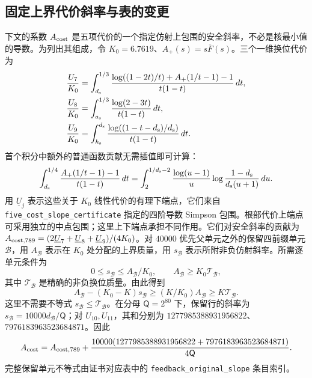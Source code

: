 \subsection{固定上界代价斜率与表的变更}
\label{num:cost-slope}
下文的系数 $A_{\rm cost}$ 是五项代价的一个指定仿射上包围的安全斜率，不必是核最小值的导数。为列出其组成，令 $K_0=6.7619$、$A_+(s)=s\overline F(s)$。三个一维换位代价为
\begin{align*}
 \frac{U_7}{K_0}&=\int_{d_{\rm s}}^{1/3}
  \frac{\log((1-2t)/t)+A_+(1/t-1)-1}{t(1-t)}\,dt,\\
 \frac{U_8}{K_0}&=\int_{a_{\rm s}}^{1/3}\frac{\log(2-3t)}{t(1-t)}\,dt,\\
 \frac{U_9}{K_0}&=\int_{h_{\rm s}}^{d_{\rm s}}\frac{\log((1-t-{d_{\rm s}})/{d_{\rm s}})}{t(1-t)}\,dt.
\end{align*}
首个积分中额外的普通函数贡献无需插值即可计算：
\[
 \int_{d_{\rm s}}^{1/4}\frac{A_+(1/t-1)-1}{t(1-t)}\,dt
 =\int_2^{1/{d_{\rm s}}-2}\frac{\log(u-1)}u
                  \log\frac{1-{d_{\rm s}}}{{d_{\rm s}}(u+1)}\,du.
\]
用 $\underline U_j$ 表示这些关于 $K_0$ 线性代价的有理下端点，它们来自 \texttt{five\_cost\_slope\_certificate} 指定的四阶导数 Simpson 包围。根部代价上端点可采用独立的中点包围；这里上下端点承担不同作用。它们对安全斜率的贡献为 $A_{{\rm cost},789}=(2\underline U_7+\underline U_8+\underline U_9)/(4K_0)$。对 $40000$ 优先父单元之外的保留四前缀单元 $\mathscr B$，用 $A_{\mathscr B}$ 表示在 $K_0$ 处分配的上界质量，用 $s_{\mathscr B}$ 表示所附非负仿射斜率。所需逐单元条件为
\begin{equation}
 0\le s_{\mathscr B}\le A_{\mathscr B}/K_0,\qquad A_{\mathscr B}\ge K_0\mathcal T_{\mathscr B},
 \label{num:affine-majorant-slope}
\end{equation}
其中 $\mathcal T_{\mathscr B}$ 是精确的非负换位质量。由此得到
\[
 A_{\mathscr B}-(K_0-K)s_{\mathscr B}\ge(K/K_0)A_{\mathscr B}\ge K\mathcal T_{\mathscr B}.
\]
这里不需要不等式 $s_{\mathscr B}\le\mathcal T_{\mathscr B}$。在分母 $\mathsf Q=2^{80}$ 下，保留行的斜率为 $s_{\mathscr B}=10000d_{\mathscr B}/\mathsf Q$；对 $U_{10},U_{11}$，其和分别为 $1277985388931956822$、$7976183963523684871$。因此
\begin{equation}
 A_{\rm cost}=A_{{\rm cost},789}+
 \frac{10000(1277985388931956822+7976183963523684871)}{4\mathsf Q}.
 \label{num:five-cost-slope}
\end{equation}
完整保留单元不等式由证书对应表中的 \texttt{feedback\_original\_slope} 条目索引。

